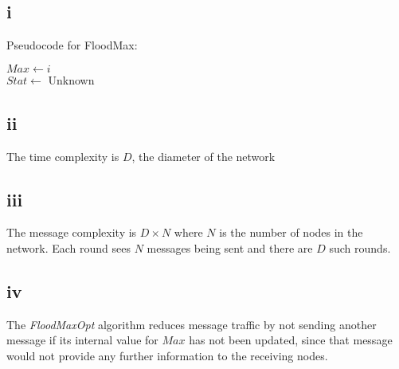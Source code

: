 \documentclass[a4paper,10pt,]{report}
\begin{document}
\subsection{i}
Pseudocode for FloodMax:
\begin{algorithm}
$Max \leftarrow i$\\
$Stat \leftarrow $ Unknown
\end{algorithm}

\subsection{ii}
The time complexity is $D$, the diameter of the network
\subsection{iii}
The message complexity is $D\times N$ where $N$ is the number of nodes in the network.  Each round sees $N$ messages being sent and there are $D$ such rounds.
\subsection{iv}
The \emph{FloodMaxOpt} algorithm reduces message traffic by not sending another message if its internal value for $Max$ has not been updated, since that message would not provide any further information to the receiving nodes.
\end{document}
